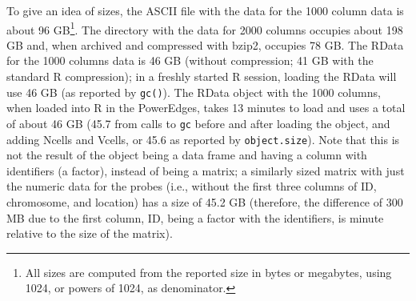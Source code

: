 \documentclass[a4paper,11pt]{article}
\begin{document}
To give an idea of sizes, the ASCII file with the data for the 1000 column
data is about 96 GB\footnote{All sizes are computed from the reported size
  in bytes or megabytes, using 1024, or powers of 1024, as
  denominator.}. The directory with the data for 2000 columns occupies
about 198 GB and, when archived and compressed with bzip2, occupies 78
GB. The RData for the 1000 columns data is 46 GB (without compression; 41
GB with the standard R compression); in a freshly started R session,
loading the RData will use 46 GB (as reported by \texttt{gc()}). The RData
object with the 1000 columns, when loaded into R in the PowerEdges, takes
13 minutes to load and uses a total of about 46 GB (45.7 from calls to
\texttt{gc} before and after loading the object, and adding Ncells and
Vcells, or 45.6 as reported by \texttt{object.size}). Note that this is
not the result of the object being a data frame and having a column with
identifiers (a factor), instead of being a matrix; a similarly sized
matrix with just the numeric data for the probes (i.e., without the first
three columns of ID, chromosome, and location) has a size of 45.2 GB
(therefore, the difference of 300 MB due to the first column, ID, being a
factor with the identifiers, is minute relative to the size of the
matrix).  











\end{document}
